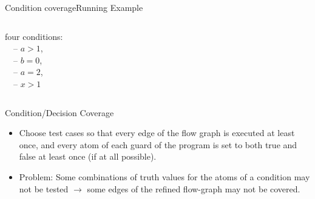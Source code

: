 \begin{Frame}{Condition coverage}{Running Example}
{\begin{columns}
    
    four conditions:\\
      \ \ -- $a>1$, \only<1,4>{\goodmark}\only<2,3>{\badmark}\\
      \ \ -- $b=0$, \\
      \ \ -- $a=2$, \\
      \ \ -- $x>1$\hphantom{,} 
		
		\xxx
   \end{columns}
   }%
\end{Frame}

\begin{Frame}{Condition/Decision Coverage}
  \begin{itemize}
    \item Choose test cases so that every edge of the flow graph is executed at least once, and every atom of each guard of the program is set to both \alert{true} and \alert{false} at least once (if at all possible).
    \item \alert{Problem:} Some combinations of truth values for the atoms of a
    condition may not be tested $\rightarrow$ some edges of the refined flow-graph may not be covered.
  \end{itemize}
\end{Frame}

